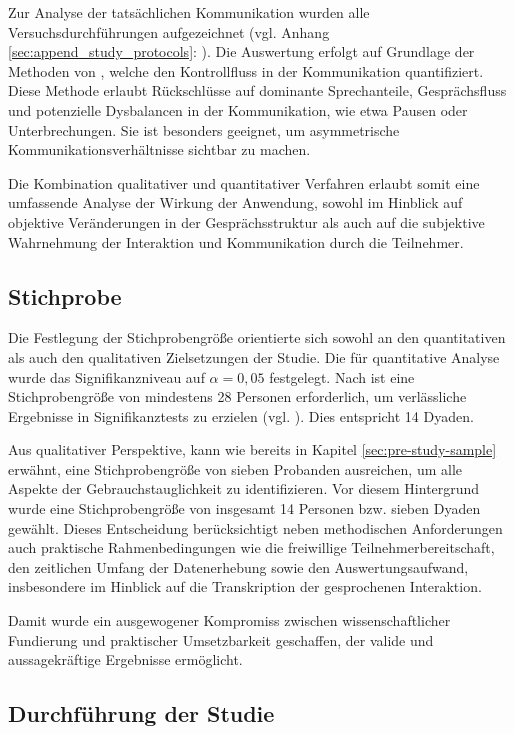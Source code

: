 Zur Analyse der tatsächlichen Kommunikation wurden alle Versuchsdurchführungen aufgezeichnet (vgl. Anhang \ref{sec:append_study_protocols}: ). Die Auswertung erfolgt auf Grundlage der Methoden von \cite{nasir_cooperative_2013,nasir_effect_2015}, welche den Kontrollfluss in der Kommunikation quantifiziert. Diese Methode erlaubt Rückschlüsse auf dominante Sprechanteile, Gesprächsfluss und potenzielle Dysbalancen in der Kommunikation, wie etwa Pausen oder Unterbrechungen. Sie ist besonders geeignet, um asymmetrische Kommunikationsverhältnisse sichtbar zu machen.

Die Kombination qualitativer und quantitativer Verfahren erlaubt somit eine umfassende Analyse der Wirkung der Anwendung, sowohl im Hinblick auf objektive Veränderungen in der Gesprächsstruktur als auch auf die subjektive Wahrnehmung der Interaktion und Kommunikation durch die Teilnehmer.

\subsection{Stichprobe}

Die Festlegung der Stichprobengröße orientierte sich sowohl an den quantitativen als auch den qualitativen Zielsetzungen der Studie. Die für quantitative Analyse wurde das Signifikanzniveau auf $\alpha = 0,05$ festgelegt. Nach \cite{cohen_power_1992} ist eine Stichprobengröße von mindestens 28 Personen erforderlich, um verlässliche Ergebnisse in Signifikanztests zu erzielen (vgl. \citealp[S. 158]{cohen_power_1992}). Dies entspricht 14 Dyaden.

Aus qualitativer Perspektive, kann wie bereits in Kapitel \ref{sec:pre-study-sample} erwähnt, eine Stichprobengröße von sieben Probanden ausreichen, um alle Aspekte der Gebrauchstauglichkeit zu identifizieren. Vor diesem Hintergrund wurde eine Stichprobengröße von insgesamt 14 Personen bzw. sieben Dyaden gewählt. Dieses Entscheidung berücksichtigt neben methodischen Anforderungen auch praktische Rahmenbedingungen wie die freiwillige Teilnehmerbereitschaft, den zeitlichen Umfang der Datenerhebung sowie den Auswertungsaufwand, insbesondere im Hinblick auf die Transkription der gesprochenen Interaktion.

Damit wurde ein ausgewogener Kompromiss zwischen wissenschaftlicher Fundierung und praktischer Umsetzbarkeit geschaffen, der valide und aussagekräftige Ergebnisse ermöglicht.

\subsection{Durchführung der Studie}

